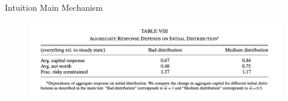 \documentclass[english,xcolor=svgnames,aspectratio=169]{beamer}
\begin{document}
\begin{frame}{Intuition Main Mechanism}
\begin{figure}
\includegraphics[scale=0.45]{figures/ow_5}
\end{figure}
\end{frame}
\end{document}
